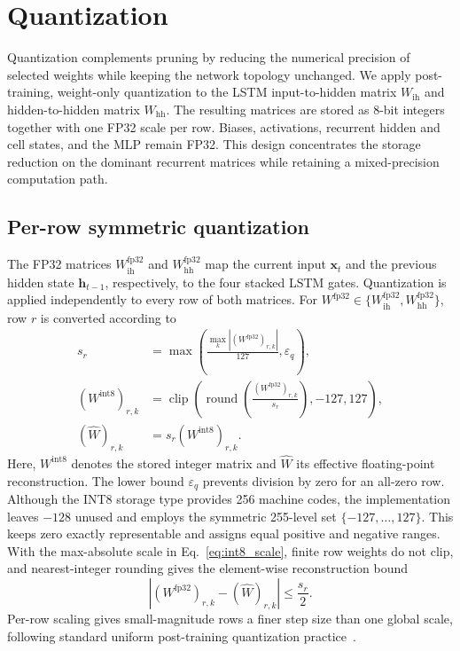 \documentclass[review]{elsarticle}
\begin{document}
\section{Quantization}
Quantization complements pruning by reducing the numerical precision of selected weights while keeping the network topology unchanged. We apply post-training, weight-only quantization to the LSTM input-to-hidden matrix $W_{\mathrm{ih}}$ and hidden-to-hidden matrix $W_{\mathrm{hh}}$. The resulting matrices are stored as 8-bit integers together with one FP32 scale per row. Biases, activations, recurrent hidden and cell states, and the MLP remain FP32. This design concentrates the storage reduction on the dominant recurrent matrices while retaining a mixed-precision computation path.

\subsection{Per-row symmetric quantization}
The FP32 matrices $W_{\mathrm{ih}}^{\mathrm{fp32}}$ and $W_{\mathrm{hh}}^{\mathrm{fp32}}$ map the current input $\mathbf{x}_t$ and the previous hidden state $\mathbf{h}_{t-1}$, respectively, to the four stacked LSTM gates. Quantization is applied independently to every row of both matrices. For $W^{\mathrm{fp32}}\in\{W_{\mathrm{ih}}^{\mathrm{fp32}},W_{\mathrm{hh}}^{\mathrm{fp32}}\}$, row $r$ is converted according to
\begin{align}
    s_r &= \max\!\left(\frac{\max_k |(W^{\mathrm{fp32}})_{r,k}|}{127},\varepsilon_q\right), \label{eq:int8_scale}\\
    (W^{\mathrm{int8}})_{r,k} &= \operatorname{clip}\!\left(\operatorname{round}\!\left(\frac{(W^{\mathrm{fp32}})_{r,k}}{s_r}\right),-127,127\right), \label{eq:int8_q}\\
    (\hat{W})_{r,k} &= s_r(W^{\mathrm{int8}})_{r,k}. \label{eq:int8_w}
\end{align}
Here, $W^{\mathrm{int8}}$ denotes the stored integer matrix and $\hat{W}$ its effective floating-point reconstruction. The lower bound $\varepsilon_q$ prevents division by zero for an all-zero row. Although the INT8 storage type provides 256 machine codes, the implementation leaves $-128$ unused and employs the symmetric 255-level set $\{-127,\ldots,127\}$. This keeps zero exactly representable and assigns equal positive and negative ranges. With the max-absolute scale in Eq.~\eqref{eq:int8_scale}, finite row weights do not clip, and nearest-integer rounding gives the element-wise reconstruction bound
\begin{equation}
    \left|(W^{\mathrm{fp32}})_{r,k}-(\hat{W})_{r,k}\right| \leq \frac{s_r}{2}.
    \label{eq:quant_error_bound}
\end{equation}
Per-row scaling gives small-magnitude rows a finer step size than one global scale, following standard uniform post-training quantization practice~\cite{jacobQuantizationTrainingNeural2017,krishnamoorthiQuantizingDeepConvolutional2018}.
\end{document}
